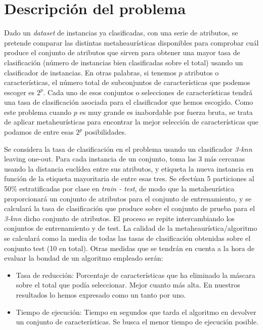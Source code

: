 \documentclass[a4paper,11pt]{article}
\newcommand{\imagent}[4]{
  \begin{wrapfigure}{#4}{0.7\textwidth}
    \begin{center}
    \texttt{[image: \#1]}
    \end{center}
    \caption{#3}
    \label{#4}
  \end{wrapfigure}
}
\newcommand{\imagen}[4]{
  \begin{minipage}{\linewidth}
    \centering
    \texttt{[image: \#1]}
    \captionof{figure}{#2}
    \label{#3}
  \end{minipage} 
}
\begin{document}
\newpage
\tableofcontents
\newpage

\section{Descripción del problema}
Dado un \textit{dataset} de instancias ya clasificadas, con una serie de atributos, se pretende comparar las distintas 
metaheaurísticas disponibles para comprobar cuál produce el conjunto de atributos que sirven para obtener una mayor 
tasa de clasificación (número de instancias bien clasificadas sobre el total) usando un clasificador de instancias.
En otras palabras, si tenemos $p$ atributos o características, el número total de subconjuntos de características que podemos
escoger es $2^p$. Cada uno de esos conjuntos o selecciones de características tendrá una tasa de clasificación asociada para
el clasificador que hemos escogido. Como este problema cuando $p$ es muy grande es inabordable por fuerza bruta, se trata de aplicar metaheurísticas para encontrar la mejor selección de características que
podamos de entre esas $2^p$ posibilidades.

Se considera la tasa de clasificación en el problema usando un clasificador \textit{3-knn} leaving one-out. Para cada 
instancia de un conjunto, toma las 3 más cercanas usando la distancia euclídea entre sus atributos, y etiqueta la nueva
instancia en función de la etiqueta mayoritaria de entre esas tres. Se efectúan 5 particiones al 50\% estratificadas
por clase en \textit{train - test}, de modo que la metaheurística proporcionará un conjunto de atributos para el conjunto de
entrenamiento, y se calculará la tasa de clasificación que produce sobre el conjunto de prueba para el \textit{3-knn} dicho
conjunto de atributos. El proceso se repite intercambiando los conjuntos de entrenamiento y de test. La calidad de la 
metaheaurística/algoritmo se calculará como la media de todas las tasas de clasificación obtenidas sobre el conjunto test
(10 en total). Otras medidas que se tendrán en cuenta a la hora de evaluar la bondad de un algoritmo empleado serán:
\begin{itemize}
 \item Tasa de reducción: Porcentaje de características que ha eliminado la máscara sobre el total que podía 
 seleccionar. Mejor cuanto más alta. En nuestros resultados lo hemos expresado como un tanto por uno.
 \item Tiempo de ejecución: Tiempo en segundos que tarda el algoritmo en devolver un conjunto de características.
 Se busca el menor tiempo de ejecución posible.
\end{itemize}
\end{document}
